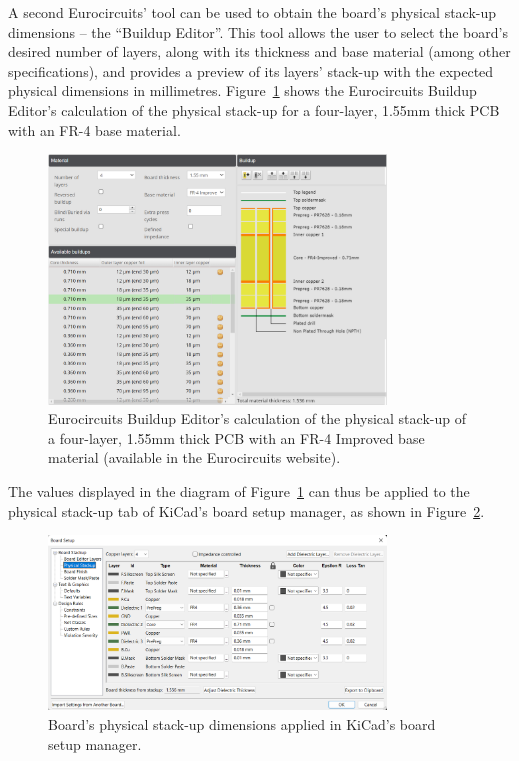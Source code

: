 A second Eurocircuits' tool can be used to obtain the board's physical stack-up dimensions -- the ``Buildup Editor''. This tool allows the user to select the board's desired number of layers, along with its thickness and base material (among other specifications), and provides a preview of its layers' stack-up with the expected physical dimensions in millimetres. Figure~\ref{fig:buildup_4layer} shows the Eurocircuits Buildup Editor's calculation of the physical stack-up for a four-layer, 1.55mm thick PCB with an FR-4 base material.

\begin{figure}[h]
	\centering
	\includegraphics[width=0.8\textwidth]{Chapters/Figures/chapter5/buildup_4layer.png}
	\caption{Eurocircuits Buildup Editor's calculation of the physical stack-up of a four-layer, 1.55mm thick PCB with an FR-4 Improved base material (available in the Eurocircuits website).}
	\label{fig:buildup_4layer}
\end{figure}

\noindent The values displayed in the diagram of Figure~\ref{fig:buildup_4layer} can thus be applied to the physical stack-up tab of KiCad's board setup manager, as shown in Figure~\ref{fig:KiCad_buildup_4layer}.

\begin{figure}[h]
	\centering
	\includegraphics[width=0.8\textwidth]{Chapters/Figures/chapter5/KiCad_buildup_4layer.png}
	\caption{Board's physical stack-up dimensions applied in KiCad's board setup manager.}
	\label{fig:KiCad_buildup_4layer}
\end{figure}

